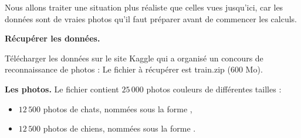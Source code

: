 \documentclass[11pt,class=report,crop=false]{standalone}
\begin{document}
Nous allons traiter une situation plus réaliste que celles vues jusqu'ici, car les données sont de \og{}vraies\fg{} photos qu'il faut préparer avant de commencer les calculs.

\textbf{Récupérer les données.}

Télécharger les données sur le site \og{}Kaggle\fg{} qui a organisé un concours de reconnaissance de photos :
Le fichier à récupérer est \og{}train.zip\fg{} ($600$ Mo).

\textbf{Les photos.}
Le fichier contient $25\,000$ photos couleurs de différentes tailles :
\begin{itemize} 
  \item $12\,500$ photos de chats, nommées sous la forme ,
  \item $12\,500$ photos de chiens, nommées sous la forme .    
\end{itemize}
\end{document}
